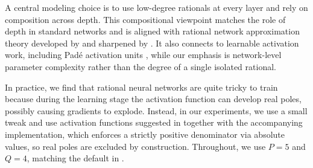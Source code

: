 \documentclass{article}
\theoremstyle{plain}
\theoremstyle{definition}
\theoremstyle{remark}
\begin{document}
A central modeling choice is to use low-degree rationals at every layer and rely on composition across depth. This compositional viewpoint matches the role of depth in standard networks and is aligned with rational network approximation theory developed by \citet{Telgarsky2017RationalFunctions} and sharpened by \citet{boulle2020rational}. It also connects to learnable activation work, including Pad\'e activation units \citet{Molina2020PAU}, while our emphasis is network-level parameter complexity rather than the degree of a single isolated rational.

In practice, we find that rational neural networks are quite tricky to train because during the learning stage the activation function can develop real poles, possibly causing gradients to explode. Instead, in our experiments, we use a small tweak and use activation functions suggested in \citet{delfosse2024adaptive} together with the accompanying implementation, which enforces a strictly positive denominator via absolute values, so real poles are excluded by construction. Throughout, we use $P=5$ and $Q=4$, matching the default in \citet{delfosse2020rationals}.

%
%
\end{document}
